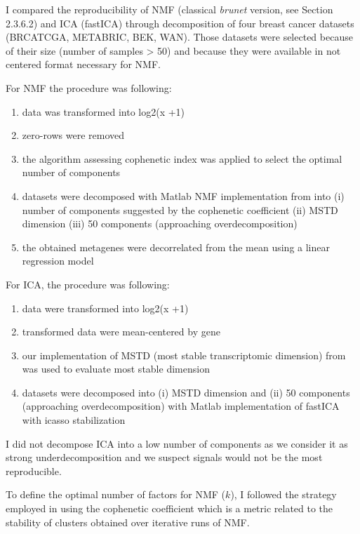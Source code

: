 \documentclass[12pt,]{book}
\providecommand{\tightlist}{%
  \setlength{\itemsep}{0pt}\setlength{\parskip}{0pt}}
\theoremstyle{definition}
\theoremstyle{definition}
\theoremstyle{definition}
\theoremstyle{remark}
\begin{document}
I compared the reproducibility of NMF (classical \emph{brunet} version,
see Section 2.3.6.2) and ICA (fastICA) through decomposition of four
breast cancer datasets (BRCATCGA, METABRIC, BEK,
WAN)\citep[\citet{Wang2005}]{Cancer2012, Curtis2012, Bekhouche2011}.
Those datasets were selected because of their size (number of samples
\textgreater{} 50) and because they were available in not centered
format necessary for NMF.

For NMF the procedure was following:

\begin{enumerate}
\def\labelenumi{\arabic{enumi}.}
\tightlist
\item
  data was transformed into log2(x +1)
\item
  zero-rows were removed
\item
  the algorithm assessing cophenetic index was applied to select the
  optimal number of components
\item
  datasets were decomposed with Matlab NMF implementation from
  \citet{Brunet2004} into (i) number of components suggested by the
  cophenetic coefficient (ii) MSTD dimension (iii) 50 components
  (approaching overdecomposition)
\item
  the obtained metagenes were decorrelated from the mean using a linear
  regression model
\end{enumerate}

For ICA, the procedure was following:

\begin{enumerate}
\def\labelenumi{\arabic{enumi}.}
\tightlist
\item
  data were transformed into log2(x +1)
\item
  transformed data were mean-centered by gene
\item
  our implementation of MSTD (most stable transcriptomic dimension) from
  \citep{Kairov2017} was used to evaluate most stable dimension
\item
  datasets were decomposed into (i) MSTD dimension and (ii) 50
  components (approaching overdecomposition) with Matlab implementation
  of fastICA with icasso stabilization
\end{enumerate}

I did not decompose ICA into a low number of components as we consider
it as strong underdecomposition and we suspect signals would not be the
most reproducible.

To define the optimal number of factors for NMF (\(k\)), I followed the
strategy employed in \citep{Brunet2004} using the cophenetic coefficient
which is a metric related to the stability of clusters obtained over
iterative runs of NMF.
\end{document}
